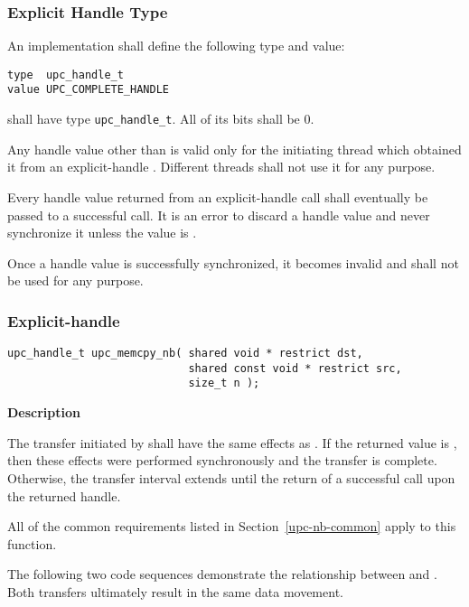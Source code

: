 \newpage
\subsubsection{Explicit Handle Type}
\npf An implementation shall define the following type and value:

\begin{verbatim}
type  upc_handle_t
value UPC_COMPLETE_HANDLE
\end{verbatim}

\np \complete shall have type {\tt upc\_handle\_t}.  All of its bits shall be 0.

\np Any handle value other than \complete is valid only for the initiating thread which 
obtained it from an explicit-handle \TIF.
Different threads shall not use it for any purpose.

\np Every handle value returned from an explicit-handle \TIF call shall eventually be passed to
a successful \sync call.  It is an error to discard a handle value and never
synchronize it unless the value is \complete. 

\np Once a handle value is successfully synchronized, it becomes invalid and shall not be
used for any purpose.

\newpage
\subsubsection{Explicit-handle \TIFs}
\def\bfunc{upc\_memcpy\_nb}
\def\sfunc{\memcpy}
\funcheader

\begin{verbatim}
upc_handle_t upc_memcpy_nb( shared void * restrict dst,
                            shared const void * restrict src, 
                            size_t n );
\end{verbatim}

{\bf Description}

\np The transfer initiated by \func\args shall have the same effects as \sfunc\args.
If the returned value is \complete, then these effects were performed synchronously
and the transfer is complete. Otherwise, the transfer interval extends until
the return of a successful \sync call upon the returned handle.

\np All of the common requirements listed in Section~\ref{upc-nb-common} apply to this function.

\np The following two code sequences demonstrate the relationship between
\sfunc and \func. Both transfers ultimately result in the same data movement.

